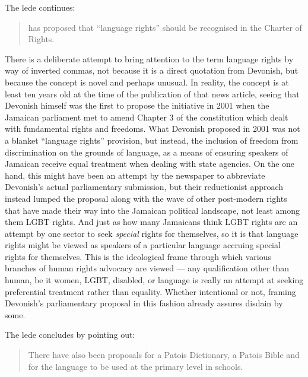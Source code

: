 \documentclass[output=paper,colorlinks,citecolor=brown]{langscibook}
\begin{document}
The lede continues: 

\begin{quote}\relax
[Devonish] has proposed that “language rights” should be recognised in the Charter of Rights.
\end{quote}

There is a deliberate attempt to bring attention to the term language rights by way of inverted commas, not because it is a direct quotation from Devonish, but because the concept is novel and perhaps unusual. In reality, the concept is at least ten years old at the time of the publication of that news article, seeing that Devonish himself was the first to propose the initiative in 2001 when the Jamaican parliament met to amend Chapter 3 of the constitution which dealt with fundamental rights and freedoms. What Devonish proposed in 2001 was not a blanket “language rights” provision, but instead, the inclusion of freedom from discrimination on the grounds of language, as a means of ensuring speakers of Jamaican receive equal treatment when dealing with state agencies. On the one hand, this might have been an attempt by the newspaper to abbreviate Devonish’s actual parliamentary submission, but their reductionist approach instead lumped the proposal along with the wave of other post-modern rights that have made their way into the Jamaican political landscape, not least among them LGBT rights. And just as how many Jamaicans think LGBT rights are an attempt by one sector to seek \emph{special} rights for themselves, so it is that language rights might be viewed as speakers of a particular language accruing special rights for themselves. This is the ideological frame through which various branches of human rights advocacy are viewed — any qualification other than human, be it women, LGBT, disabled, or language is really an attempt at seeking preferential treatment rather than equality. Whether intentional or not, framing Devonish’s parliamentary proposal in this fashion already assures disdain by some. 

The lede concludes by pointing out:

\begin{quote}
    There have also been proposals for a Patois Dictionary, a Patois Bible and for the language to be used at the primary level in schools.
\end{quote}
\end{document}
